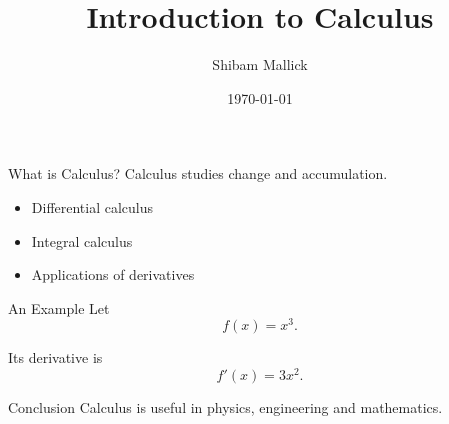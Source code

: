 \documentclass{beamer}
\title{Introduction to Calculus}
\author{Shibam Mallick}
\institute{Serampore College}
\date{\today}
\begin{document}
\begin{frame}
    \titlepage
\end{frame}

\begin{frame}{What is Calculus?}
Calculus studies change and accumulation.

\begin{itemize}
    \item Differential calculus
    \item Integral calculus
    \item Applications of derivatives
\end{itemize}
\end{frame}

\begin{frame}{An Example}
Let
\[
f(x)=x^3.
\]

Its derivative is
\[
f'(x)=3x^2.
\]
\end{frame}

\begin{frame}{Conclusion}
Calculus is useful in physics,
engineering and mathematics.
\end{frame}
\end{document}
